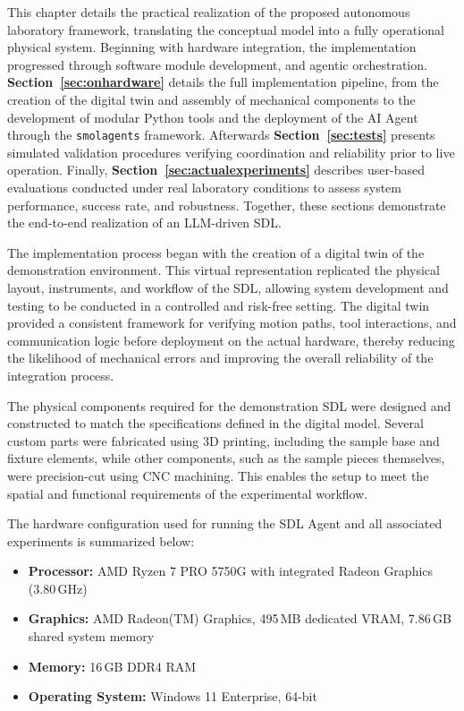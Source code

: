 
This chapter details the practical realization of the proposed autonomous laboratory framework, translating the conceptual model into a fully operational physical system. Beginning with hardware integration, the implementation progressed through software module development, and agentic orchestration. \textbf{Section~\ref{sec:onhardware}} details the full implementation pipeline, from the creation of the digital twin and assembly of mechanical components to the development of modular Python tools and the deployment of the AI Agent through the \texttt{smolagents} framework. Afterwards \textbf{Section~\ref{sec:tests}} presents simulated validation procedures verifying coordination and reliability prior to live operation. Finally, \textbf{Section~\ref{sec:actualexperiments}} describes user-based evaluations conducted under real laboratory conditions to assess system performance, success rate, and robustness. Together, these sections demonstrate the end-to-end realization of an LLM-driven SDL.


The implementation process began with the creation of a digital twin of the demonstration environment. This virtual representation replicated the physical layout, instruments, and workflow of the SDL, allowing system development and testing to be conducted in a controlled and risk-free setting. The digital twin provided a consistent framework for verifying motion paths, tool interactions, and communication logic before deployment on the actual hardware, thereby reducing the likelihood of mechanical errors and improving the overall reliability of the integration process.

The physical components required for the demonstration SDL were designed and constructed to match the specifications defined in the digital model. Several custom parts were fabricated using 3D printing, including the sample base and fixture elements, while other components, such as the sample pieces themselves, were precision-cut using CNC machining. This enables the setup to meet the spatial and functional requirements of the experimental workflow.

The hardware configuration used for running the SDL Agent and all associated experiments is summarized below:

\begin{itemize}
    \item \textbf{Processor:} AMD Ryzen 7 PRO 5750G with integrated Radeon Graphics (3.80\,GHz)
    \item \textbf{Graphics:} AMD Radeon(TM) Graphics, 495\,MB dedicated VRAM, 7.86\,GB shared system memory
    \item \textbf{Memory:} 16\,GB DDR4 RAM
    \item \textbf{Operating System:} Windows 11 Enterprise, 64-bit
\end{itemize}

